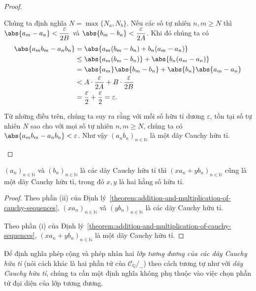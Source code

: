 \begin{proof}
\begin{enumerate}[label={(\roman*)}]
              Chúng ta định nghĩa $N = \max\{ N_{a}, N_{b}\}$. Nếu các số tự nhiên $n, m\geq N$ thì $\abs{a_{m} - a_{n}} < \dfrac{\varepsilon}{2B}$ và $\abs{b_{m} - b_{n}} < \dfrac{\varepsilon}{2A}$. Khi đó chúng ta có
              \begin{align*}
                  \abs{a_{m}b_{m} - a_{n}b_{n}} & = \abs{a_{m}(b_{m} - b_{n}) + b_{n}(a_{m} - a_{n})}               \\
                                                & \leq \abs{a_{m}(b_{m} - b_{n})} + \abs{b_{n}(a_{m} - a_{n})}      \\
                                                & = \abs{a_{m}}\abs{b_{m} - b_{n}} + \abs{b_{n}}\abs{a_{m} - a_{n}} \\
                                                & < A\cdot \frac{\varepsilon}{2A} + B\cdot\frac{\varepsilon}{2B}    \\
                                                & = \frac{\varepsilon}{2} + \frac{\varepsilon}{2} = \varepsilon.
              \end{align*}

              Từ những điều trên, chúng ta suy ra rằng với mỗi số hữu tỉ dương $\varepsilon$, tồn tại số tự nhiên $N$ sao cho với mọi số tự nhiên $n, m\geq N$, chúng ta có $\abs{a_{m}b_{m} - a_{n}b_{n}} < \varepsilon$. Như vậy ${(a_{n}b_{n})}_{n\in\mathbb{N}}$ là một dãy Cauchy hữu tỉ.
    \end{enumerate}
\end{proof}

\begin{corollary}\label{corollary:linear-combination-of-cauchy-sequences}
    ${(a_{n})}_{n\in\mathbb{N}}$ và ${(b_{n})}_{n\in\mathbb{N}}$ là các dãy Cauchy hữu tỉ thì ${(xa_{n} + yb_{n})}_{n\in\mathbb{N}}$ cũng là một dãy Cauchy hữu tỉ, trong đó $x, y$ là hai hằng số hữu tỉ.
\end{corollary}

\begin{proof}
    Theo phần (ii) của Định lý~\ref{theorem:addition-and-multiplication-of-cauchy-sequences}, ${(xa_{n})}_{n\in\mathbb{N}}$ và ${(yb_{n})}_{n\in\mathbb{N}}$ là các dãy Cauchy hữu tỉ.

    Theo phần (i) của Định lý~\ref{theorem:addition-and-multiplication-of-cauchy-sequences}, ${(xa_{n} + yb_{n})}_{n\in\mathbb{N}}$ là một dãy Cauchy hữu tỉ.
\end{proof}

Để định nghĩa phép cộng và phép nhân hai \textit{lớp tương đương của các dãy Cauchy hữu tỉ} (nói cách khác là hai phần tử của $\mathscr{C}_{\mathbb{Q}}/_{\sim}$) theo cách tương tự như với \textit{dãy Cauchy hữu tỉ}, chúng ta cần một định nghĩa không phụ thuộc vào việc chọn phần tử đại diện của lớp tương đương.

